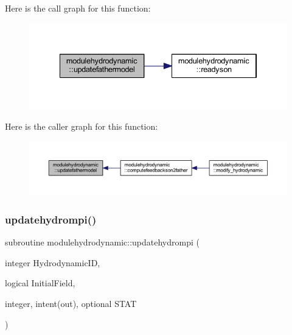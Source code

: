 Here is the call graph for this function\+:\nopagebreak
\begin{figure}[H]
\begin{center}
\leavevmode
\includegraphics[width=334pt]{namespacemodulehydrodynamic_a18824f0ade9c1b8a9140a405a5a343db_cgraph}
\end{center}
\end{figure}
Here is the caller graph for this function\+:\nopagebreak
\begin{figure}[H]
\begin{center}
\leavevmode
\includegraphics[width=350pt]{namespacemodulehydrodynamic_a18824f0ade9c1b8a9140a405a5a343db_icgraph}
\end{center}
\end{figure}
\mbox{\label{namespacemodulehydrodynamic_a0b6a544e894ede118ad20bf00d80fa39}} 
\subsubsection{\texorpdfstring{updatehydrompi()}{updatehydrompi()}}
{\footnotesize\ttfamily subroutine modulehydrodynamic\+::updatehydrompi (\begin{DoxyParamCaption}\item[{integer}]{Hydrodynamic\+ID,  }\item[{logical}]{Initial\+Field,  }\item[{integer, intent(out), optional}]{S\+T\+AT }\end{DoxyParamCaption})\hspace{0.3cm}{\ttfamily [private]}}

